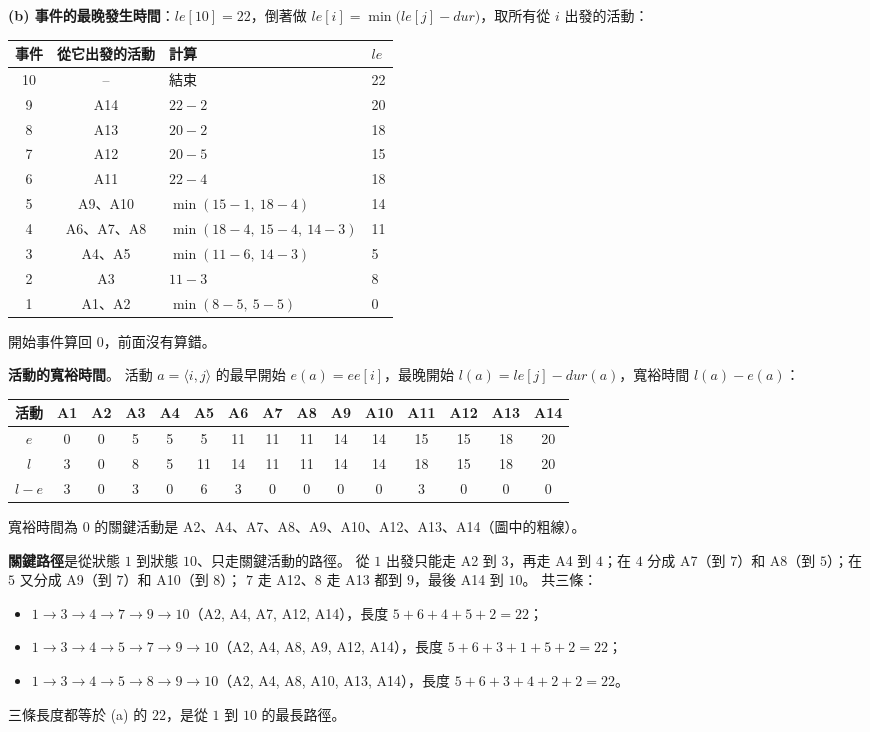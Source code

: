 \begin{pastsoln}
\textbf{(b) 事件的最晚發生時間}：$\mathit{le}[10] = 22$，倒著做
$\mathit{le}[i] = \min\bigl(\mathit{le}[j] - \mathit{dur}\bigr)$，取所有從 $i$ 出發的活動：
\begin{center}
\begin{tabular}{ccll}
\toprule
事件 & 從它出發的活動 & 計算 & $\mathit{le}$ \\
\midrule
10 & -- & 結束 & 22 \\
9 & A14 & $22 - 2$ & 20 \\
8 & A13 & $20 - 2$ & 18 \\
7 & A12 & $20 - 5$ & 15 \\
6 & A11 & $22 - 4$ & 18 \\
5 & A9、A10 & $\min(15 - 1,\ 18 - 4)$ & 14 \\
4 & A6、A7、A8 & $\min(18 - 4,\ 15 - 4,\ 14 - 3)$ & 11 \\
3 & A4、A5 & $\min(11 - 6,\ 14 - 3)$ & 5 \\
2 & A3 & $11 - 3$ & 8 \\
1 & A1、A2 & $\min(8 - 5,\ 5 - 5)$ & 0 \\
\bottomrule
\end{tabular}
\end{center}
開始事件算回 $0$，前面沒有算錯。

\textbf{活動的寬裕時間}。 活動 $a = \langle i, j\rangle$ 的最早開始 $e(a) = \mathit{ee}[i]$，最晚開始
$l(a) = \mathit{le}[j] - \mathit{dur}(a)$，寬裕時間 $l(a) - e(a)$：
\begin{center}
\small
\begin{tabular}{c*{14}{c}}
\toprule
活動 & A1 & A2 & A3 & A4 & A5 & A6 & A7 & A8 & A9 & A10 & A11 & A12 & A13 & A14 \\
\midrule
$e$ & 0 & 0 & 5 & 5 & 5 & 11 & 11 & 11 & 14 & 14 & 15 & 15 & 18 & 20 \\
$l$ & 3 & 0 & 8 & 5 & 11 & 14 & 11 & 11 & 14 & 14 & 18 & 15 & 18 & 20 \\
$l - e$ & 3 & 0 & 3 & 0 & 6 & 3 & 0 & 0 & 0 & 0 & 3 & 0 & 0 & 0 \\
\bottomrule
\end{tabular}
\end{center}
寬裕時間為 $0$ 的關鍵活動是 A2、A4、A7、A8、A9、A10、A12、A13、A14（圖中的粗線）。

\textbf{關鍵路徑}是從狀態 $1$ 到狀態 $10$、只走關鍵活動的路徑。 從 $1$ 出發只能走 A2 到 $3$，再走
A4 到 $4$；在 $4$ 分成 A7（到 $7$）和 A8（到 $5$）；在 $5$ 又分成 A9（到 $7$）和 A10（到 $8$）；
$7$ 走 A12、$8$ 走 A13 都到 $9$，最後 A14 到 $10$。 共三條：
\begin{itemize}
\item $1 \to 3 \to 4 \to 7 \to 9 \to 10$（A2, A4, A7, A12, A14），長度 $5 + 6 + 4 + 5 + 2 = 22$；
\item $1 \to 3 \to 4 \to 5 \to 7 \to 9 \to 10$（A2, A4, A8, A9, A12, A14），長度
$5 + 6 + 3 + 1 + 5 + 2 = 22$；
\item $1 \to 3 \to 4 \to 5 \to 8 \to 9 \to 10$（A2, A4, A8, A10, A13, A14），長度
$5 + 6 + 3 + 4 + 2 + 2 = 22$。
\end{itemize}
三條長度都等於 (a) 的 $22$，是從 $1$ 到 $10$ 的最長路徑。
\end{pastsoln}
